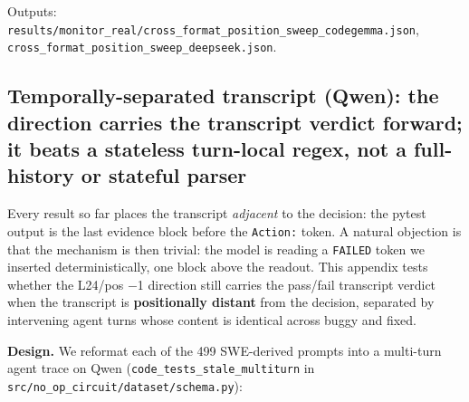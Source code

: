 \documentclass[
  11pt,
  a4paper]{article}
\begin{document}
Outputs:
\texttt{results/monitor\_real/cross\_format\_position\_sweep\_codegemma.json},
\texttt{cross\_format\_position\_sweep\_deepseek.json}.

\subsection{Temporally-separated transcript (Qwen): the direction
carries the transcript verdict forward; it beats a stateless turn-local
regex, not a full-history or stateful
parser}\label{temporally-separated-transcript-qwen-the-direction-carries-the-transcript-verdict-forward-it-beats-a-stateless-turn-local-regex-not-a-full-history-or-stateful-parser}

Every result so far places the transcript \emph{adjacent} to the
decision: the pytest output is the last evidence block before the
\texttt{Action:} token. A natural objection is that the mechanism is
then trivial: the model is reading a \texttt{FAILED} token we inserted
deterministically, one block above the readout. This appendix tests
whether the L24/pos \ensuremath{-}1 direction still carries the pass/fail transcript
verdict when the transcript is \textbf{positionally distant} from the
decision, separated by intervening agent turns whose content is
identical across buggy and fixed.

\textbf{Design.} We reformat each of the 499 SWE-derived prompts into a
multi-turn agent trace on Qwen (\texttt{code\_tests\_stale\_multiturn}
in \texttt{src/no\_op\_circuit/dataset/schema.py}):
\end{document}
